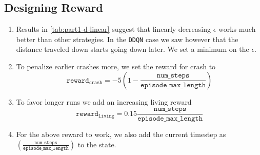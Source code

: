 \subsection{Designing Reward}\label{sec:reward_design}
\begin{enumerate}
    \item Results in \autoref{tab:part1-d-linear} suggest that linearly decreasing $\epsilon$ works much better than other strategies. In the \texttt{DDQN} case we saw however that the distance traveled down starts going down later. We set a minimum on the $\epsilon$.

    \item To penalize earlier crashes more, we set the reward for crash to
    \begin{equation*}
       \texttt{reward}_{\texttt{crash}} =  -5\left(1 - \frac{\texttt{num\_steps}}{\texttt{episode\_max\_length}}
       \right)
    \end{equation*}
    \item To favor longer runs we add an increasing living reward
        \begin{equation*}
       \texttt{reward}_{\texttt{living}} =  0.15 \frac{\texttt{num\_steps}}{\texttt{episode\_max\_length}}
    \end{equation*}
    \item For the above reward to work, we also add the current timestep as $\left(\frac{\texttt{num\_steps}}{\texttt{episode\_max\_length}}\right)$ to the state. 
\end{enumerate}


